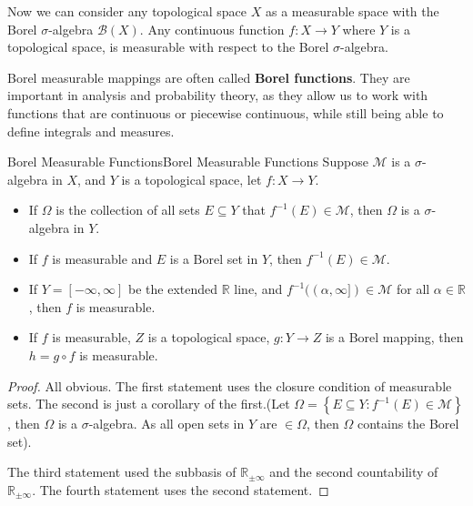 \documentclass[../main.tex]{subfiles}
\begin{document}
Now we can consider any topological space $X$ as a measurable space with the Borel $\sigma$-algebra $\mathcal{B}(X)$. Any continuous function $f: X \rightarrow Y$ where $Y$ is a topological space, is measurable with respect to the Borel $\sigma$-algebra.

Borel measurable mappings are often called \textbf{Borel functions}. They are important in analysis and probability theory, as they allow us to work with functions that are continuous or piecewise continuous, while still being able to define integrals and measures.

\begin{proposition}{Borel Measurable Functions}{Borel Measurable Functions}
Suppose $\mathcal{M}$ is a $\sigma$-algebra in $X$, and $Y$ is a topological space, let $f: X \rightarrow Y$.
\begin{itemize}
	\item If $\Omega$ is the collection of all sets $E \subseteq Y$ that $f^{-1}(E)\in \mathcal{M}$, then $\Omega$ is a $\sigma$-algebra in $Y$.
	\item If $f$ is measurable and $E$ is a Borel set in $Y$, then $f^{-1}(E)\in \mathcal{M}$.
	\item If $Y = [-\infty ,\infty ]$ be the extended $\mathbb{R}$ line, and $f^{-1}((\alpha,\infty ])\in \mathcal{M}$ for all $\alpha\in \mathbb{R}$, then $f$ is measurable.
	\item If $f$ is measurable, $Z$ is a topological space, $g: Y \rightarrow Z$ is a Borel mapping, then $h=g\circ f$ is measurable.
\end{itemize}
\end{proposition}
\begin{proof}
All obvious. The first statement uses the closure condition of measurable sets. The second is just a corollary of the first.(Let $\Omega = \left\{ E \subseteq Y: f^{-1}(E)\in \mathcal{M} \right\}$, then $\Omega$ is a $\sigma$-algebra. As all open sets in $Y$ are $\in \Omega$, then $\Omega$ contains the Borel set).

The third statement used the subbasis of $\mathbb{R}_{\pm \infty }$ and the second countability of $\mathbb{R}_{\pm \infty }$. The fourth statement uses the second statement.
\end{proof}
\end{document}
